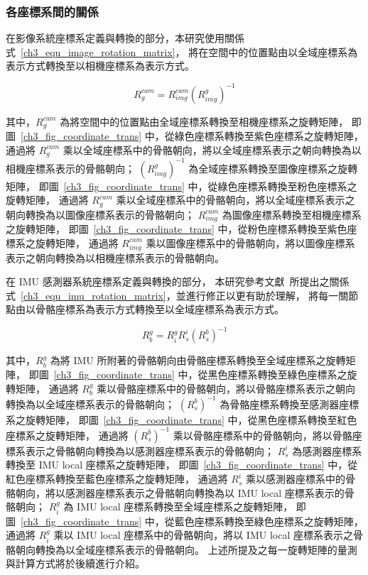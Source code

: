 \subsubsection{各座標系間的關係}
在影像系統座標系定義與轉換的部分，本研究使用關係式~\ref{ch3_equ_image_rotation_matrix}，
將在空間中的位置點由以全域座標系為表示方式轉換至以相機座標系為表示方式。

\begin{equation}
   R^{cam}_{g} = R^{cam}_{img}(R^{g}_{img})^{-1}
   \label{ch3_equ_image_rotation_matrix}
\end{equation}

其中，$R^{cam}_g$ 為將空間中的位置點由全域座標系轉換至相機座標系之旋轉矩陣，
即圖~\ref{ch3_fig_coordinate_trans} 中，從綠色座標系轉換至紫色座標系之旋轉矩陣，
通過將 $R^{cam}_g$ 乘以全域座標系中的骨骼朝向，將以全域座標系表示之朝向轉換為以相機座標系表示的骨骼朝向；
$(R^{g}_{img})^{-1}$ 為全域座標系轉換至圖像座標系之旋轉矩陣，
即圖~\ref{ch3_fig_coordinate_trans} 中，從綠色座標系轉換至粉色座標系之旋轉矩陣，
通過將 $R^{cam}_g$ 乘以全域座標系中的骨骼朝向，將以全域座標系表示之朝向轉換為以圖像座標系表示的骨骼朝向；
$R^{cam}_{img}$ 為圖像座標系轉換至相機座標系之旋轉矩陣，
即圖~\ref{ch3_fig_coordinate_trans} 中，從粉色座標系轉換至紫色座標系之旋轉矩陣，
通過將 $R^{cam}_{img}$ 乘以圖像座標系中的骨骼朝向，將以圖像座標系表示之朝向轉換為以相機座標系表示的骨骼朝向。

在 IMU 感測器系統座標系定義與轉換的部分，
本研究參考文獻~\cite{malleson2017real}所提出之關係式~\ref{ch3_equ_imu_rotation_matrix}，並進行修正以更有助於理解，
將每一關節點由以骨骼座標系為表示方式轉換至以全域座標系為表示方式。

\begin{equation}
   R^g_b=R^g_iR^i_s(R^b_s)^{-1}
   \label{ch3_equ_imu_rotation_matrix}
\end{equation}

其中，$R^g_b$ 為將 IMU 所附著的骨骼朝向由骨骼座標系轉換至全域座標系之旋轉矩陣，
即圖~\ref{ch3_fig_coordinate_trans} 中，從黑色座標系轉換至綠色座標系之旋轉矩陣，
通過將 $R^g_b$ 乘以骨骼座標系中的骨骼朝向，將以骨骼座標系表示之朝向轉換為以全域座標系表示的骨骼朝向；
$(R^b_s)^{-1}$ 為骨骼座標系轉換至感測器座標系之旋轉矩陣，
即圖~\ref{ch3_fig_coordinate_trans} 中，從黑色座標系轉換至紅色座標系之旋轉矩陣，
通過將 $(R^b_s)^{-1}$ 乘以骨骼座標系中的骨骼朝向，將以骨骼座標系表示之骨骼朝向轉換為以感測器座標系表示的骨骼朝向；
$R^i_s$ 為感測器座標系轉換至 IMU local 座標系之旋轉矩陣，
即圖~\ref{ch3_fig_coordinate_trans} 中，從紅色座標系轉換至藍色座標系之旋轉矩陣，
通過將 $R^i_s$ 乘以感測器座標系中的骨骼朝向，將以感測器座標系表示之骨骼朝向轉換為以 IMU local 座標系表示的骨骼朝向；
$R^g_i$ 為 IMU local 座標系轉換至全域座標系之旋轉矩陣，
即圖~\ref{ch3_fig_coordinate_trans} 中，從藍色座標系轉換至綠色座標系之旋轉矩陣，
通過將 $R^g_i$ 乘以 IMU local 座標系中的骨骼朝向，將以 IMU local 座標系表示之骨骼朝向轉換為以全域座標系表示的骨骼朝向。
上述所提及之每一旋轉矩陣的量測與計算方式將於後續進行介紹。

